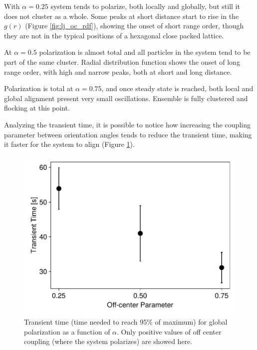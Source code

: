 \documentclass[../../master_thesis_np.tex]{subfiles}
\begin{document}
		With $\alpha = 0.25$ system tends to polarize, both locally and globally, but still it does not cluster as a whole. 
		Some peaks at short distance start to rise in the $g(r)$ (Figure \ref{fig:lj_oc_rdf}), showing the onset of short range order, though they are not in the typical positions of a hexagonal close packed lattice.
		
		At $\alpha = 0.5$ polarization is almost total and all particles in the system tend to be part of the same cluster.
		Radial distribution function shows the onset of long range order, with high and narrow peaks, both at short and long distance.
		
		Polarization is total at $\alpha = 0.75$, and once steady state is reached, both local and global alignment present very small oscillations.
		Ensemble is fully clustered and flocking at this point.
		
		Analyzing the transient time, it is possible to notice how increasing the coupling parameter between orientation angles tends to reduce the transient time, making it faster for the system to align (Figure \ref{fig:transienttime_oc}).
		\begin{figure}[htp]
			\centering
			\includegraphics[width = \singfigwidth]{lj_oc/transient_time_alpha.pdf}
			
			\caption{Transient time (time needed to reach 95\% of maximum) for global polarization as a function of $\alpha$. Only positive values of off center coupling (where the system polarizes) are showed here.}
			\label{fig:transienttime_oc}
		\end{figure}
		
\end{document}
